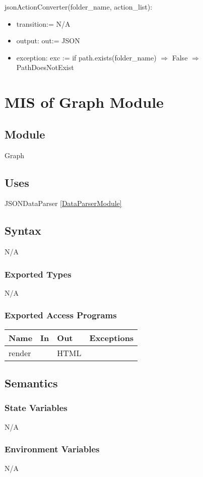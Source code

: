 \documentclass[12pt, titlepage]{article}
\begin{document}
\noindent jsonActionConverter(folder\_name, action\_list):
\begin{itemize}
\item transition:= N/A
\item output: out:= JSON
\item exception: exc := if path.exists(folder\_name) $\Rightarrow$ False $\Rightarrow$ PathDoesNotExist
\end{itemize}
\newpage
\section{MIS of Graph Module} \label{GraphModule} 
\subsection{Module}
Graph

\subsection{Uses}
JSONDataParser \ref{DataParserModule}

\subsection{Syntax}
N/A
\subsubsection{Exported Types}
N/A
\subsubsection{Exported Access Programs}

\begin{tabular}{p{2cm} p{4cm} p{4cm} p{5cm}}
\hline
\textbf{Name} & \textbf{In} & \textbf{Out} & \textbf{Exceptions} \\
\hline
render & & HTML &  \\
\hline
\end{tabular}

\subsection{Semantics}

\subsubsection{State Variables}
N/A
\subsubsection{Environment Variables}
N/A
\end{document}
